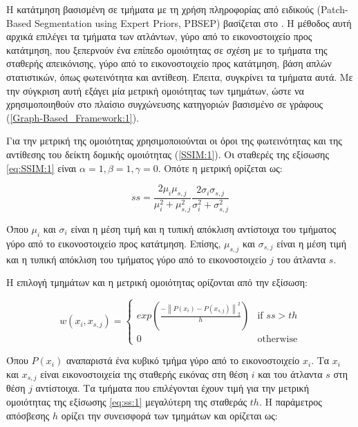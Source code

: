 \documentclass[a4paper,12pt]{article}
\newcommand\norm[1]{\left\lVert#1\right\rVert}
\begin{document}
Η κατάτμηση βασισμένη σε τμήματα με τη χρήση πληροφορίας από ειδικούς
(Patch-Based Segmentation using Expert Priors, PBSEP) βασίζεται στο
\cite{Coupe:1}. Η μέθοδος αυτή αρχικά επιλέγει τα τμήματα των ατλάντων, γύρο από
το εικονοστοιχείο προς κατάτμηση, που ξεπερνούν ένα επίπεδο ομοιότητας σε σχέση
με το τμήματα της σταθερής απεικόνισης, γύρο από το εικονοστοιχείο προς
κατάτμηση, βάση απλών στατιστικών, όπως φωτεινότητα και αντίθεση. Έπειτα,
συγκρίνει τα τμήματα αυτά. Με την σύγκριση αυτή εξάγει μία μετρική ομοιότητας
των τμημάτων, ώστε να χρησιμοποιηθούν στο πλαίσιο συγχώνευσης κατηγοριών
βασισμένο σε γράφους (\ref{Graph-Based_Framework:1}).

Για την μετρική της ομοιότητας χρησιμοποιούνται οι όροι της φωτεινότητας και της
αντίθεσης του δείκτη δομικής ομοιότητας (\ref{SSIM:1}). Οι σταθερές της εξίσωσης
\eqref{eq:SSIM:1} είναι $\alpha = 1, \beta = 1, \gamma = 0$. Οπότε η μετρική
ορίζεται ως:

\begin{equation} \label{eq:ss:1}
    ss = \frac {2 \mu_i \mu_{s,j}} {\mu_i^2 + \mu_{s,j}^2} 
         \frac {2 \sigma_i \sigma_{s,j}} {\sigma_i^2 + \sigma_{s,j}^2}
\end{equation}

Όπου $\mu_i$ και $\sigma_i$ είναι η μέση τιμή και η τυπική απόκλιση αντίστοιχα
του τμήματος γύρο από το εικονοστοιχείο προς κατάτμηση. Επίσης, $\mu_{s,j}$ και
$\sigma_{s,j}$ είναι η μέση τιμή και η τυπική απόκλιση του τμήματος γύρο από το
εικονοστοιχείο $j$ του άτλαντα $s$.

Η επιλογή τμημάτων και η μετρική ομοιότητας ορίζονται από την εξίσωση:

\begin{equation} \label{eq:w_PBSEP:1}
    w(x_i, x_{s,j}) = 
    \begin{cases}
        exp\left( \frac {- \norm{P(x_i) - P(x_{s,j})}_2^2 } {h} \right)
            & \text{if } ss > th\\
        0   & \text{otherwise}
    \end{cases}
\end{equation}

Όπου $P(x_i)$ αναπαριστά ένα κυβικό τμήμα γύρο από το εικονοστοιχείο $x_i$. Τα
$x_i$ και $x_{s,j}$ είναι εικονοστοιχεία της σταθερής εικόνας στη θέση $i$ και
του άτλαντα $s$ στη θέση $j$ αντίστοιχα. Τα τμήματα που επιλέγονται έχουν τιμή
για την μετρική ομοιότητας της εξίσωσης \eqref{eq:ss:1} μεγαλύτερη της σταθεράς
$th$. Η παράμετρος απόσβεσης $h$ ορίζει την συνεισφορά των τμημάτων και ορίζεται
ως:
\end{document}
